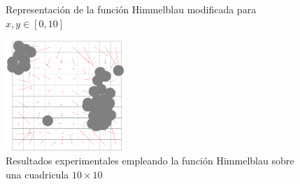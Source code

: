 \documentclass[runningheads]{llncs}
\newcommand{\comment}[1]{}
\begin{document}
    \begin{figure}[htbp]
        \centering
        \caption{Representación de la función Himmelblau modificada para $x,y\in[0,10]$}
        \label{fig:4}
    \end{figure}

    \begin{figure}[htbp]
        \centering
        \includegraphics[width=0.4\textwidth]{funciones/Resultados_himmelblau_10x10}
        \caption{Resultados experimentales empleando la función Himmelblau sobre una cuadricula $10\times10$}
        \label{fig:5}
    \end{figure}

    \comment{
    \subsubsection{Función Lineal}
    $f(x,y)=-(x-g_x)^2 - (y - g_y)^2 + 700$; con máximo en $(g_x,g_y)$
    }
\end{document}
